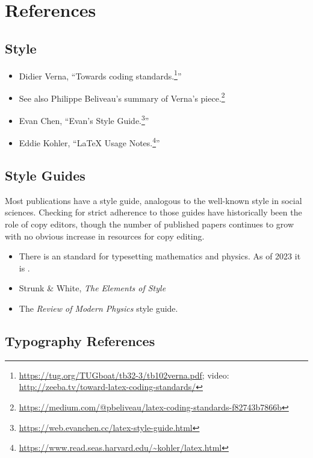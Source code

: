 
\section{References}

\subsection{\texorpdfstring{\LaTeXx Style}{LaTeX Style}}

\begin{itemize}
    \item Didier Verna, ``Towards \LaTeXx coding standards.\footnote{\url{https://tug.org/TUGboat/tb32-3/tb102verna.pdf}; video: \url{http://zeeba.tv/toward-latex-coding-standards/}}'' 
    \item See also Philippe Beliveau's summary of Verna's piece.\footnote{\url{https://medium.com/@pbeliveau/latex-coding-standards-f82743b7866b}}
    \item Evan Chen, ``Evan's \LaTeXx Style Guide.\footnote{\url{https://web.evanchen.cc/latex-style-guide.html}}''
    \item Eddie Kohler, ``LaTeX Usage Notes.\footnote{\url{https://www.read.seas.harvard.edu/~kohler/latex.html}}''
\end{itemize}


\subsection{Style Guides}

Most publications have a style guide, analogous to the well-known  style in social sciences. Checking for strict adherence to those guides have historically been the role of copy editors, though the number of published papers continues to grow with no obvious increase in resources for copy editing. 

\begin{itemize}
    \item There is an  standard for typesetting mathematics and physics. As of 2023 it is .
    \item Strunk \& White, \emph{The Elements of Style}
    \item The \emph{Review of Modern Physics} style guide. 
\end{itemize}

\subsection{Typography References}

